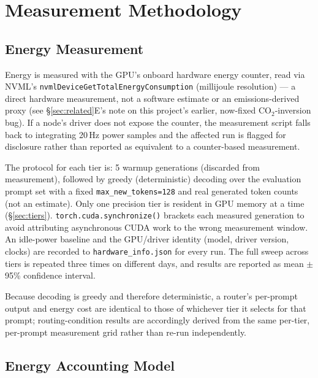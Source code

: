 \documentclass[conference]{IEEEtran}
\begin{document}
\section{Measurement Methodology}
\label{sec:method}

\subsection{Energy Measurement}

Energy is measured with the GPU's onboard hardware energy counter, read
via NVML's \texttt{nvmlDeviceGetTotalEnergyConsumption} (millijoule
resolution) --- a direct hardware measurement, not a software estimate or
an emissions-derived proxy (see \S\ref{sec:related}E's note on this
project's earlier, now-fixed CO$_2$-inversion bug). If a node's driver
does not expose the counter, the measurement script falls back to
integrating 20\,Hz power samples and the affected run is flagged for
disclosure rather than reported as equivalent to a counter-based
measurement.

The protocol for each tier is: 5 warmup generations (discarded from
measurement), followed by greedy (deterministic) decoding over the
evaluation prompt set with a fixed \texttt{max\_new\_tokens=128} and real
generated token counts (not an estimate). Only one precision tier is
resident in GPU memory at a time (\S\ref{sec:tiers}).
\texttt{torch.cuda.synchronize()} brackets each measured generation to
avoid attributing asynchronous CUDA work to the wrong measurement window.
An idle-power baseline and the GPU/driver identity (model, driver
version, clocks) are recorded to \texttt{hardware\_info.json} for every
run. The full sweep across tiers is repeated three times on different
days, and results are reported as mean $\pm$ 95\% confidence interval.

Because decoding is greedy and therefore deterministic, a router's
per-prompt output and energy cost are identical to those of whichever
tier it selects for that prompt; routing-condition results are
accordingly derived from the same per-tier, per-prompt measurement grid
rather than re-run independently.

\subsection{Energy Accounting Model}
\label{sec:energymodel}
\end{document}
